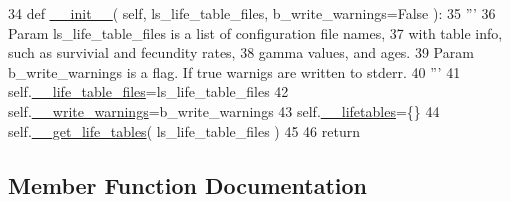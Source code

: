 \begin{DoxyCode}
34     \textcolor{keyword}{def }\hyperlink{classnegui_1_1pgsimupopresources_1_1PGSimuPopResources_a8e79c3f4c6c291a606c9f0c2f259a293}{\_\_init\_\_}( self, ls\_life\_table\_files, b\_write\_warnings=False ):
35         \textcolor{stringliteral}{'''}
36 \textcolor{stringliteral}{        Param ls\_life\_table\_files is a list of configuration file names,}
37 \textcolor{stringliteral}{            with table info, such as survivial and fecundity rates,}
38 \textcolor{stringliteral}{            gamma values, and ages.}
39 \textcolor{stringliteral}{        Param b\_write\_warnings is a flag. If true warnigs are written to stderr.}
40 \textcolor{stringliteral}{        '''}
41         self.\hyperlink{classnegui_1_1pgsimupopresources_1_1PGSimuPopResources_a70ffb8eb62a843aec8f42e337c81fc3b}{\_\_life\_table\_files}=ls\_life\_table\_files
42         self.\hyperlink{classnegui_1_1pgsimupopresources_1_1PGSimuPopResources_ae4805ab6ba55817bc2e40fd622d76483}{\_\_write\_warnings}=b\_write\_warnings
43         self.\hyperlink{classnegui_1_1pgsimupopresources_1_1PGSimuPopResources_ae32ca7cc4b6a1563734a82da0a0c6608}{\_\_lifetables}=\{\}
44         self.\hyperlink{classnegui_1_1pgsimupopresources_1_1PGSimuPopResources_aed06da70af5eea2be1c6caabf35032af}{\_\_get\_life\_tables}( ls\_life\_table\_files )
45 
46         \textcolor{keywordflow}{return}
\end{DoxyCode}


\subsection{Member Function Documentation}
